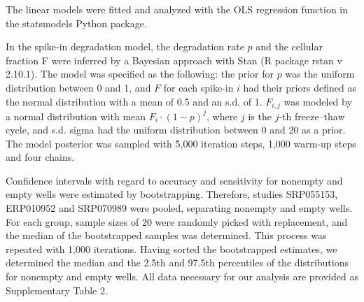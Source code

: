 The linear models were fitted and analyzed with the OLS regression function in the statsmodels Python package.

In the spike-in degradation model, the degradation rate \( p \) and the cellular fraction F were inferred by a Bayesian approach with Stan \cite{Carpenter2016-zx} (R package rstan v 2.10.1). The model was specified as the following: the prior for \( p \) was the uniform distribution between 0 and 1, and \( F \) for each spike-in \( i \) had their priors defined as the normal distribution with a mean of 0.5 and an s.d. of 1. \( F_{i,j} \) was modeled by a normal distribution with mean \( F_i \cdot (1 - p)^j \), where \( j \) is the \( j \)-th freeze–thaw cycle, and s.d. {sigma} had the uniform distribution between 0 and 20 as a prior. The model posterior was sampled with 5,000 iteration steps, 1,000 warm-up steps and four chains.

Confidence intervals with regard to accuracy and sensitivity for nonempty and empty wells were estimated by bootstrapping. Therefore, studies SRP055153, ERP010952 and SRP070989 were pooled, separating nonempty and empty wells. For each group, sample sizes of 20 were randomly picked with replacement, and the median of the bootstrapped samples was determined. This process was repeated with 1,000 iterations. Having sorted the bootstrapped estimates, we determined the median and the 2.5th and 97.5th percentiles of the distributions for nonempty and empty wells. All data necessary for our analysis are provided as Supplementary Table 2.

